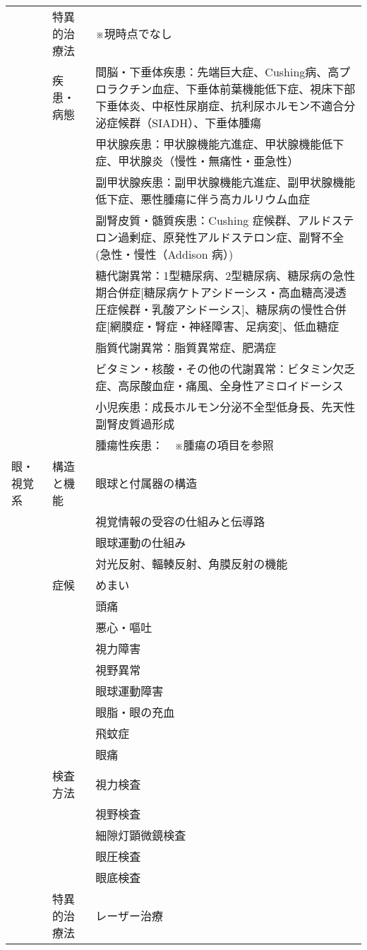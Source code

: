 \begin{xltabular}{\linewidth}{XXX}
 & 特異的治療法 & ※現時点でなし \\
 & 疾患・病態 & 間脳・下垂体疾患：先端巨大症、Cushing病、高プロラクチン血症、下垂体前葉機能低下症、視床下部下垂体炎、中枢性尿崩症、抗利尿ホルモン不適合分泌症候群（SIADH）、下垂体腫瘍 \\
 &  & 甲状腺疾患：甲状腺機能亢進症、甲状腺機能低下症、甲状腺炎（慢性・無痛性・亜急性） \\
 &  & 副甲状腺疾患：副甲状腺機能亢進症、副甲状腺機能低下症、悪性腫瘍に伴う高カルリウム血症 \\
 &  & 副腎皮質・髄質疾患：Cushing 症候群、アルドステロン過剰症、原発性アルドステロン症、副腎不全(急性・慢性（Addison 病）) \\
 &  & 糖代謝異常：1型糖尿病、2型糖尿病、糖尿病の急性期合併症[糖尿病ケトアシドーシス・高血糖高浸透圧症候群・乳酸アシドーシス]、糖尿病の慢性合併症[網膜症・腎症・神経障害、足病変]、低血糖症 \\
 &  & 脂質代謝異常：脂質異常症、肥満症 \\
 &  & ビタミン・核酸・その他の代謝異常：ビタミン欠乏症、高尿酸血症・痛風、全身性アミロイドーシス \\
 &  & 小児疾患：成長ホルモン分泌不全型低身長、先天性副腎皮質過形成 \\
 &  & 腫瘍性疾患：　※腫瘍の項目を参照 \\
眼・視覚系 & 構造と機能 & 眼球と付属器の構造 \\
 &  & 視覚情報の受容の仕組みと伝導路 \\
 &  & 眼球運動の仕組み \\
 &  & 対光反射、輻輳反射、角膜反射の機能 \\
 & 症候 & めまい \\
 &  & 頭痛 \\
 &  & 悪心・嘔吐 \\
 &  & 視力障害 \\
 &  & 視野異常 \\
 &  & 眼球運動障害 \\
 &  & 眼脂・眼の充血 \\
 &  & 飛蚊症 \\
 &  & 眼痛 \\
 & 検査方法 & 視力検査 \\
 &  & 視野検査 \\
 &  & 細隙灯顕微鏡検査 \\
 &  & 眼圧検査 \\
 &  & 眼底検査 \\
 & 特異的治療法 & レーザー治療 \\

\end{xltabular}

